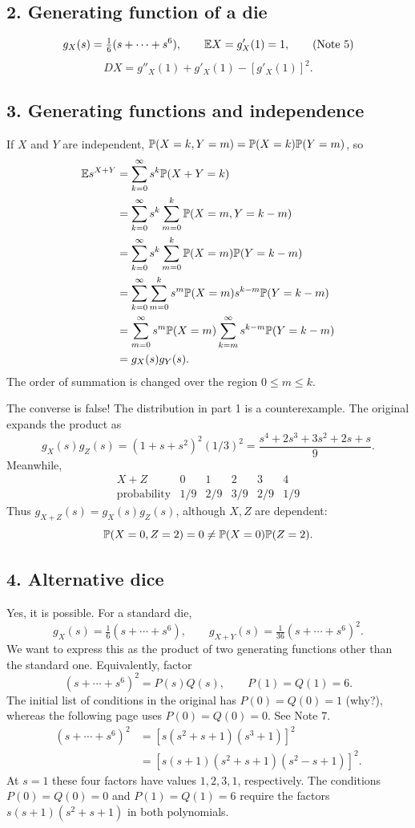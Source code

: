 \documentclass[11pt,a4paper]{article}
\begin{document}
\subsection*{2. Generating function of a die}
\[
g_X(s)=\tfrac16(s+\cdots+s^6),\qquad
\E X=g'_X(1)=1,\tag{Note 5}
\]
\[
DX=g''_X(1)+g'_X(1)-[g'_X(1)]^2.
\]

\subsection*{3. Generating functions and independence}
If $X$ and $Y$ are independent, $\P(X=k,Y=m)=\P(X=k)\P(Y=m)$, so
\begin{align*}
\E s^{X+Y}
&=\sum_{k=0}^\infty s^k\P(X+Y=k)\\
&=\sum_{k=0}^\infty s^k\sum_{m=0}^k\P(X=m,Y=k-m)\\
&=\sum_{k=0}^\infty s^k\sum_{m=0}^k\P(X=m)\P(Y=k-m)\\
&=\sum_{k=0}^\infty\sum_{m=0}^k s^m\P(X=m)s^{k-m}\P(Y=k-m)\\
&=\sum_{m=0}^\infty s^m\P(X=m)\sum_{k=m}^\infty s^{k-m}\P(Y=k-m)\\
&=g_X(s)g_Y(s).
\end{align*}
The order of summation is changed over the region $0\le m\le k$.

The converse is false! The distribution in part 1 is a counterexample. The original expands the product as
\[
g_X(s)g_Z(s)=(1+s+s^2)^2(1/3)^2
=\frac{s^4+2s^3+3s^2+2s+s}{9}.\tag{Note 6}
\]
Meanwhile,
\[
\begin{array}{c|ccccc}
X+Z&0&1&2&3&4\\\hline
\text{probability}&1/9&2/9&3/9&2/9&1/9
\end{array}
\]
Thus $g_{X+Z}(s)=g_X(s)g_Z(s)$, although $X,Z$ are dependent:
\[
\P(X=0,Z=2)=0\ne\P(X=0)\P(Z=2).
\]

\subsection*{4. Alternative dice}
Yes, it is possible. For a standard die,
\[
g_X(s)=\tfrac16(s+\cdots+s^6),\qquad
g_{X+Y}(s)=\tfrac1{36}(s+\cdots+s^6)^2.
\]
We want to express this as the product of two generating functions other than the standard one. Equivalently, factor
\[
(s+\cdots+s^6)^2=P(s)Q(s),\qquad P(1)=Q(1)=6.
\]
The initial list of conditions in the original has $P(0)=Q(0)=1$ (why?), whereas the following page uses $P(0)=Q(0)=0$. See Note 7.
\begin{align*}
(s+\cdots+s^6)^2
&=[s(s^2+s+1)(s^3+1)]^2\\
&=[s(s+1)(s^2+s+1)(s^2-s+1)]^2.
\end{align*}
At $s=1$ these four factors have values $1,2,3,1$, respectively. The conditions $P(0)=Q(0)=0$ and $P(1)=Q(1)=6$ require the factors $s(s+1)(s^2+s+1)$ in both polynomials.
\end{document}
